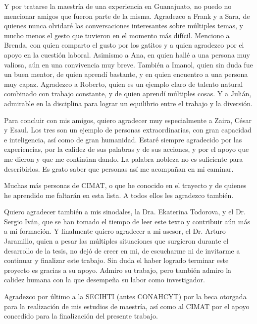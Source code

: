 \documentclass[letterpaper,twoside,12pt]{book}
\newcommand{\1}{\mathds{1}}
\theoremstyle{definition}
\theoremstyle{definition}
\theoremstyle{remark}
\theoremstyle{definition}
\theoremstyle{definition}
\theoremstyle{definition}
\theoremstyle{definition}
\theoremstyle{definition}
\begin{document}
Y por tratarse la maestría de una experiencia en Guanajuato, no puedo no mencionar amigos que fueron parte de la misma. Agradezco a Frank y a Sara, de quienes nunca olvidaré las conversaciones interesantes sobre múltiples temas, y mucho menos el gesto que tuvieron en el momento más difícil. Menciono a Brenda, con quien comparto el gusto por los gatitos y a quien agradezco por el apoyo en la cuestión laboral. Asimismo a Ana, en quien hallé a una persona muy valiosa, aún en una convivencia muy breve. También a Imanol, quien sin duda fue un buen mentor, de quien aprendí bastante, y en quien encuentro a una persona muy capaz. Agradezco a Roberto, quien es un ejemplo claro de talento natural combinado con trabajo constante, y de quien aprendí múltiples cosas. Y a Julián, admirable en la disciplina para lograr un equilibrio entre el trabajo y la diversión. 

Para concluir con mis amigos, quiero agradecer muy especialmente a Zaira, César y Esaul. Los tres son un ejemplo de personas extraordinarias, con gran capacidad e inteligencia, así como de gran humanidad. Estaré siempre agradecido por las experiencias, por la calidez de sus palabras y de sus acciones, y por el apoyo que me dieron y que me continúan dando. La palabra nobleza no es suficiente para describirlos. Es grato saber que personas así me acompañan en mi caminar.

Muchas más personas de CIMAT, o que he conocido en el trayecto y de quienes he aprendido me faltarán en esta lista. A todos ellos les agradezco también.

Quiero agradecer también a mis sinodales, la Dra. Ekaterina Todorova, y el Dr. Sergio Iván, que se han tomado el tiempo de leer este texto y contribuir aún más a mi formación. Y finalmente quiero agradecer a mi asesor, el Dr. Arturo Jaramillo, quien a pesar las múltiples situaciones que surgieron durante el desarrollo de la tesis, no dejó de creer en mi, de escucharme ni de invitarme a continuar y finalizar este trabajo. Sin duda el haber logrado terminar este proyecto es gracias a su apoyo. Admiro su trabajo, pero también admiro la calidez humana con la que desempeña su labor como investigador.

Agradezco por último a la SECIHTI (antes CONAHCYT) por la beca otorgada para la realización de mis estudios de maestría, así como al CIMAT por el apoyo concedido para la finalización del presente trabajo.

\tableofcontents
\end{document}
